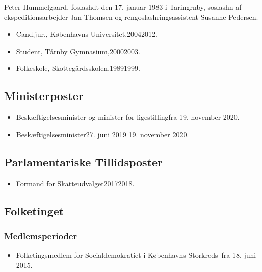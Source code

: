 \documentclass[11pt, a4paper]{awesome-cv}
\begin{document}
\makecvheader[R]
\makelettertitle
\begin{cvletter}
Peter Hummelgaard, foslashdt den 17. januar 1983 i Taringrnby, soslashn af ekspeditionsarbejder Jan Thomsen og rengoslashringsassistent Susanne Pedersen.

\begin{itemize}
\item Cand.jur., Københavns Universitet,20042012.
\item Student, Tårnby Gymnasium,20002003.
\item Folkeskole, Skottegårdsskolen,19891999.
\end{itemize}
\subsection*{Ministerposter}
\begin{itemize}
\item Beskæftigelsesminister og minister for ligestillingfra 19. november 2020.
\item Beskæftigelsesminister27. juni 2019  19. november 2020.
\end{itemize}
\subsection*{Parlamentariske Tillidsposter}
\begin{itemize}
\item Formand for Skatteudvalget20172018.
\end{itemize}
\subsection*{Folketinget}
\subsubsection*{Medlemsperioder}
\begin{itemize}
\item Folketingsmedlem for Socialdemokratiet i Københavns Storkreds fra 18. juni 2015.
\end{itemize}

\end{cvletter}
\end{document}

